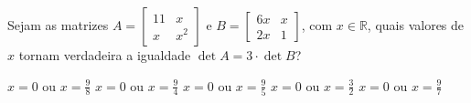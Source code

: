 Sejam as matrizes $A = \left[ \begin{array}{cc}
11 & x \\
x & x^2
\end{array} \right]$ e $B = \left[ \begin{array}{cc}
6x & x \\
2x & 1
\end{array} \right]$, com $x\in\mathbb{R}$, quais valores de $x$ tornam verdadeira a igualdade $\det A=3\cdot\det B$?

$x=0$ ou $x=\frac{9}{8}$
$x=0$ ou $x=\frac{9}{4}$
$x=0$ ou $x=\frac{9}{5}$
$x=0$ ou $x=\frac{3}{2}$
$x=0$ ou $x=\frac{9}{7}$



